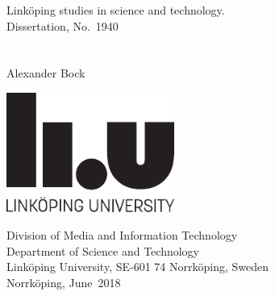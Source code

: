 \setbirthplace{~}
\phden
{}

\def\fronttitleM{\thesistitle}
\def\fronttitleS{~}
\renewcommand{\author}{\thesisauthor} %
\newcommand{\thesismonth}{June}
\newcommand{\thesisyear}{2018}
\newcommand{\thesisno}{1940}
\newcommand{\isbn}{ISBN: 978-91-7685-291-0}
\newcommand{\issn}{ISSN: 0345-7524}


\thispagestyle{empty}

\makeatletter
\begin{center}
  \large Link{\"o}ping studies in science and technology.\\
  Dissertation, No.\ \thesisno\\[8 mm]
  {\large \MakeUppercase{\fronttitleM}}\\[1 mm]
  {\large \textit{\fronttitleS}}\\[8 mm]
  {\large Alexander Bock}\\[1 cm]
\end{center}
\vfill \vspace{2cm}
\centerline{\includegraphics[width=5.5cm]{figures/logo/linkuniv_staende_eng}}
\vfill
\begin{center}
\end{center}
\vfill
\begin{center}
  Division of Media and Information Technology\\
  Department of Science and Technology\\
  Link{\"o}ping University, SE-601 74 Norrk{\"o}ping, Sweden\\[0mm]
  Norrk{\"o}ping, \thesismonth~\thesisyear
\end{center}

\clearpage
